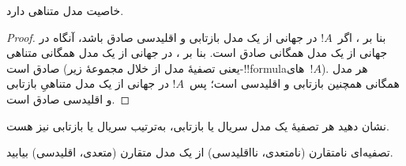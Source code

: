 \documentclass[../../../include/open-logic-section]{subfiles}
\begin{document}
\begin{cor}
   خاصیت مدل متناهی دارد.
\end{cor}

\begin{proof}
  بنا بر ، اگر~$!A$ در جهانی از یک مدل
  بازتابی و اقلیدسی صادق باشد، آنگاه در جهانی از یک مدل همگانی صادق
  است. بنا بر ، در جهانی از یک مدل همگانی متناهی
  صادق است (یعنی تصفیهٔ مدل از خلال مجموعهٔ زیر-!!{formula}های~$!A$).
  هر مدل همگانی همچنین بازتابی و اقلیدسی است؛ پس~$!A$ در جهانی از یک
  مدل متناهیِ بازتابی و اقلیدسی صادق است.
\end{proof}

\begin{prob}
  نشان دهید هر تصفیهٔ یک مدل سریال یا بازتابی، به‌ترتیب سریال یا
  بازتابی نیز هست.
\end{prob}

\begin{prob}
  تصفیه‌ای نامتقارن (نامتعدی، نااقلیدسی) از یک مدل متقارن (متعدی،
  اقلیدسی) بیابید.
\end{prob}
\end{document}

